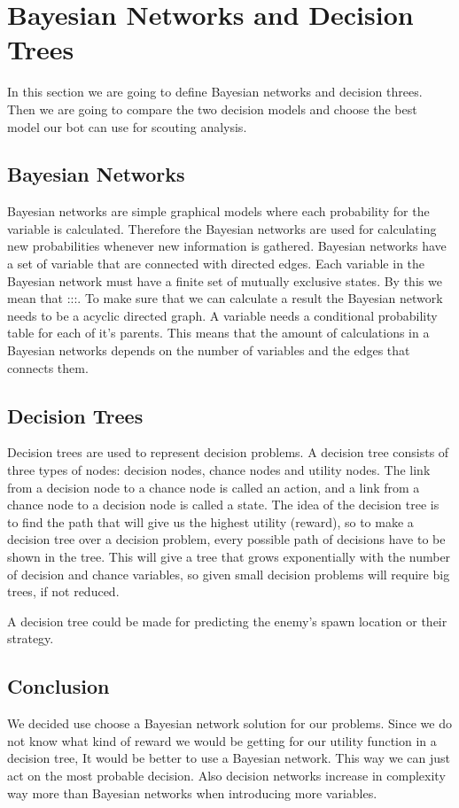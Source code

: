 \section{Bayesian Networks and Decision Trees}
In this section we are going to define Bayesian networks and decision threes. Then we are going to compare the two decision models and choose the best model our bot can use for scouting analysis.

\subsection{Bayesian Networks}
	Bayesian networks are simple graphical models where each probability for the variable is calculated. Therefore the Bayesian networks are used for calculating new probabilities whenever new information is gathered. Bayesian networks have a  set of variable that are connected with directed edges. Each variable in the Bayesian network must have a finite set of mutually exclusive states. By this we mean that :::. To make sure that we can calculate a result the Bayesian network needs to be a acyclic directed graph. A variable needs a conditional probability table for each of it's parents. This means that the amount of calculations in a Bayesian networks depends on the number of variables and the	edges that connects them.

\subsection{Decision Trees}
Decision trees are used to represent decision problems. A decision tree consists of three types of nodes: decision nodes, chance nodes and utility nodes. The link from a decision node to a chance node is called an action, and a link from a chance node to a decision node is called a state. The idea of the decision tree is to find the path that will give us the highest utility (reward), so to make a decision tree over a decision problem, every possible path of decisions have to be shown in the tree. This will give a tree that grows exponentially with the number of decision and chance variables, so given small decision problems will require big trees, if not reduced. 
	
A decision tree could be made for predicting the enemy's spawn location or their strategy. 
	
\subsection{Conclusion}
We decided use choose a Bayesian network solution for our problems. Since we do not know what kind of reward we would be getting for our utility function in a decision tree, It would be better to use a Bayesian network. This way we can just act on the most probable decision. Also decision networks increase in complexity way more than Bayesian networks when introducing more variables.